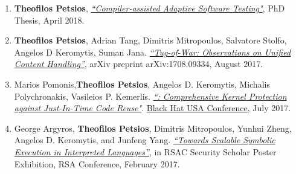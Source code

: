\begin{cvparagraph}
\begin{enumerate}[label=O\arabic*]
    \item \textbf{Theofilos Petsios}, \href{https://academiccommons.columbia.edu/doi/10.7916/D8M05NGN}{\textit{``Compiler-assisted Adaptive Software Testing"}}, PhD Thesis, April 2018.
    \item \textbf{Theofilos Petsios}, Adrian Tang, Dimitris Mitropoulos, Salvatore Stolfo, Angelos D Keromytis, Suman Jana. \href{https://arxiv.org/pdf/1708.09334.pdf}{\textit{``Tug-of-War: Observations on Unified Content Handling''}}, arXiv preprint arXiv:1708.09334, August 2017.
    \item Marios Pomonis,\textbf{Theofilos Petsios}, Angelos D. Keromytis,
        Michalis Polychronakis, Vasileios P. Kemerlis.
        \href{https://www.blackhat.com/us-17/briefings.html#kr^x-comprehensive-kernel-protection-against-just-in-time-code-reuse}
        {\textit{``\krx: Comprehensive
        Kernel Protection against Just-In-Time Code Reuse"}}. \href{https://www.blackhat.com/us-17/}{Black Hat USA Conference},
        July 2017.\label{itm:krx}
    \item George Argyros, \textbf{Theofilos Petsios}, Dimitris Mitropoulos,
        Yunhui Zheng, Angelos D. Keromytis, and Junfeng Yang.
        \href{https://www.rsaconference.com/writable/files/About/towards_scalable_symbolic_execution_in_interpreted_languages.pdf}{\textit{``Towards Scalable Symbolic Execution in Interpreted Languages''}}, in RSAC Security Scholar Poster Exhibition, RSA Conference, February 2017.
        \label{itm:poster_arpegio}
\end{enumerate}
\end{cvparagraph}

